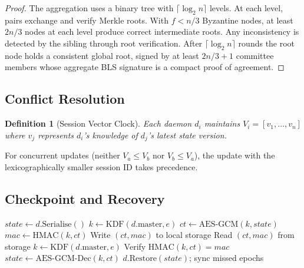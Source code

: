 \documentclass[11pt,a4paper]{article}
\newtheorem{definition}{Definition}[section]
\begin{document}
\begin{proof}
    The aggregation uses a binary tree with $\lceil \log_2 n \rceil$
    levels.  At each level, pairs exchange and verify Merkle roots.  With
    $f < n/3$ Byzantine nodes, at least $2n/3$ nodes at each level produce
    correct intermediate roots.  Any inconsistency is detected by the
    sibling through root verification.  After $\lceil \log_2 n \rceil$
    rounds the root node holds a consistent global root, signed by at
    least $2n/3 + 1$ committee members whose aggregate BLS signature is a
    compact proof of agreement.
\end{proof}

\subsection{Conflict Resolution}

\begin{definition}[Session Vector Clock]
    Each daemon $d_i$ maintains $V_i = [v_1, \dots, v_n]$ where $v_j$
    represents $d_i$'s knowledge of $d_j$'s latest state version.
\end{definition}

For concurrent updates (neither $V_a \leq V_b$ nor $V_b \leq V_a$), the
update with the lexicographically smaller session ID takes precedence.

\subsection{Checkpoint and Recovery}

\begin{algorithm}[H]
\caption{Checkpoint and Recovery}
\label{alg:checkpoint}
\begin{algorithmic}[1]
    \State $\mathit{state} \gets d.\mathrm{Serialise}()$
    \State $k \gets \mathrm{KDF}(d.\mathrm{master}, e)$
    \State $\mathit{ct} \gets \mathrm{AES\text{-}GCM}(k, \mathit{state})$
    \State $\mathit{mac} \gets \mathrm{HMAC}(k, \mathit{ct})$
    \State Write $(\mathit{ct}, \mathit{mac})$ to local storage
\EndProcedure
{}
    \State Read $(\mathit{ct}, \mathit{mac})$ from storage
    \State $k \gets \mathrm{KDF}(d.\mathrm{master}, e)$
    \State Verify $\mathrm{HMAC}(k, \mathit{ct}) = \mathit{mac}$
    \State $\mathit{state} \gets \mathrm{AES\text{-}GCM\text{-}Dec}(k, \mathit{ct})$
    \State $d.\mathrm{Restore}(\mathit{state})$; sync missed epochs
\EndProcedure
\end{algorithmic}
\end{algorithm}
\end{document}
